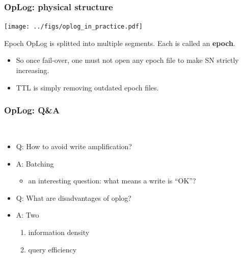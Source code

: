 \documentclass[lualatex]{beamer}
\renewcommand{\emph}{\textbf}
\begin{document}
\begin{frame}[t]
  \frametitle{OpLog: physical structure}
  \begin{center}
    \texttt{[image: ../figs/oplog\_in\_practice.pdf]}
  \end{center}
  \begin{block}{Epoch}
    OpLog is splitted into multiple segments.
    Each is called an \emph{epoch}.
    \begin{itemize}
      \item So once fail-over, one must not open any epoch file to make SN strictly increasing.
      \item TTL is simply removing outdated epoch files.
    \end{itemize}
  \end{block}
\end{frame}

\begin{frame}
  \frametitle{OpLog: Q\&A}
  \begin{block}{~}
    \begin{itemize}
      \item Q: How to avoid write amplification?
      \item<2-> A: Batching
        \begin{itemize}
          \item an interesting question: what means a write is ``OK''?
        \end{itemize}
      \item Q: What are disadvantages of oplog?
      \item<3> A: Two
        \begin{enumerate}
          \item information density
          \item query efficiency
        \end{enumerate}
    \end{itemize}
  \end{block}
\end{frame}
\end{document}
